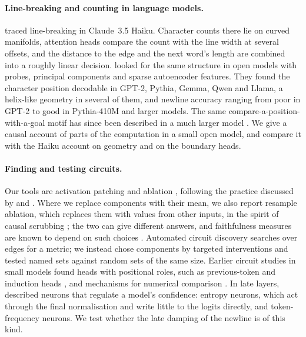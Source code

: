 \documentclass[11pt,a4paper]{article}
\begin{document}
\paragraph{Line-breaking and counting in language models.}
\citet{gurnee2026manifolds} traced line-breaking in Claude~3.5 Haiku. Character counts there lie on curved manifolds, attention heads compare the count with the line width at several offsets, and the distance to the edge and the next word's length are combined into a roughly linear decision. \citet{sinii2026counting} looked for the same structure in open models with probes, principal components and sparse autoencoder features. They found the character position decodable in GPT-2, Pythia, Gemma, Qwen and Llama, a helix-like geometry in several of them, and newline accuracy ranging from poor in GPT-2 to good in Pythia-410M and larger models. The same compare-a-position-with-a-goal motif has since been described in a much larger model \citep{dunefsky2026countdown}. We give a causal account of parts of the computation in a small open model, and compare it with the Haiku account on geometry and on the boundary heads.

\paragraph{Finding and testing circuits.}
Our tools are activation patching and ablation \citep{meng2022locating,wang2023interpretability}, following the practice discussed by \citet{zhang2024patching} and \citet{heimersheim2024patching}. Where we replace components with their mean, we also report resample ablation, which replaces them with values from other inputs, in the spirit of causal scrubbing \citep{chan2022causal}; the two can give different answers, and faithfulness measures are known to depend on such choices \citep{miller2024faithfulness}. Automated circuit discovery \citep{conmy2023automated} searches over edges for a metric; we instead chose components by targeted interventions and tested named sets against random sets of the same size. Earlier circuit studies in small models found heads with positional roles, such as previous-token and induction heads \citep{elhage2021framework,olsson2022induction}, and mechanisms for numerical comparison \citep{hanna2023greaterthan}. In late layers, \citet{stolfo2024confidence} described neurons that regulate a model's confidence: entropy neurons, which act through the final normalisation and write little to the logits directly, and token-frequency neurons. We test whether the late damping of the newline is of this kind.
\end{document}
